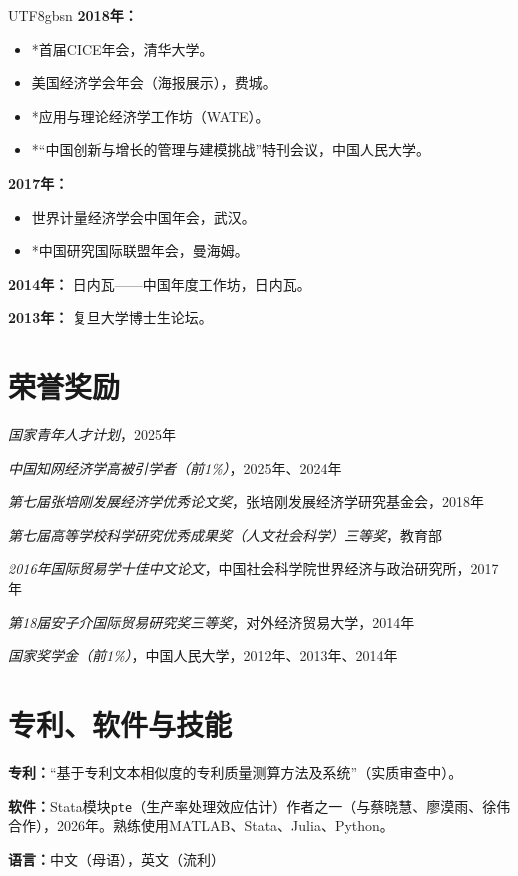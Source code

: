 \documentclass[letterpaper]{article}
\begin{document}
\begin{CJK}{UTF8}{gbsn}
\textbf{2018年：}
\begin{itemize}[leftmargin=1.6em, itemsep=0.25em, topsep=0.2em]
  \item *首届CICE年会，清华大学。
  \item 美国经济学会年会（海报展示），费城。
  \item *应用与理论经济学工作坊（WATE）。
  \item *“中国创新与增长的管理与建模挑战”特刊会议，中国人民大学。
\end{itemize}

\textbf{2017年：}
\begin{itemize}[leftmargin=1.6em, itemsep=0.25em, topsep=0.2em]
  \item 世界计量经济学会中国年会，武汉。
  \item *中国研究国际联盟年会，曼海姆。
\end{itemize}

\textbf{2014年：} 日内瓦——中国年度工作坊，日内瓦。

\vspace{0.3em}
\textbf{2013年：} 复旦大学博士生论坛。

\section*{\textsc{荣誉奖励}}

\textit{国家青年人才计划}，2025年

\vspace{0.5em}
\textit{中国知网经济学高被引学者（前1\%）}，2025年、2024年

\vspace{0.5em}
\textit{第七届张培刚发展经济学优秀论文奖}，张培刚发展经济学研究基金会，2018年

\vspace{0.5em}
\textit{第七届高等学校科学研究优秀成果奖（人文社会科学）三等奖}，教育部

\vspace{0.5em}
\textit{2016年国际贸易学十佳中文论文}，中国社会科学院世界经济与政治研究所，2017年

\vspace{0.5em}
\textit{第18届安子介国际贸易研究奖三等奖}，对外经济贸易大学，2014年

\vspace{0.5em}
\textit{国家奖学金（前1\%）}，中国人民大学，2012年、2013年、2014年

\section*{\textsc{专利、软件与技能}}
\textbf{专利：}“基于专利文本相似度的专利质量测算方法及系统”（实质审查中）。

\vspace{0.5em}
\textbf{软件：}Stata模块\texttt{pte}（生产率处理效应估计）作者之一（与蔡晓慧、廖漠雨、徐伟合作），2026年。熟练使用MATLAB、Stata、Julia、Python。

\vspace{0.5em}
\textbf{语言：}中文（母语），英文（流利）

\clearpage
\end{CJK}
\end{document}
